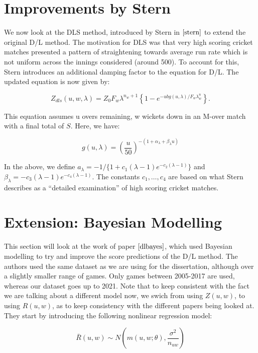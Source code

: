 \section{Improvements by Stern}
We now look at the DLS method, introduced by Stern in $\cite{stern}$ to extend the original D/L method. The motivation for DLS was that very high scoring
cricket matches presented a pattern of straightening towards average run rate which is not uniform across the innings considered (around 500). To account for 
this, Stern introduces an additional damping factor to the equation for D/L. The updated equation is now given by:

\begin{equation}
    \label{dls}
    Z_{dls}(u,w,\lambda) = Z_0F_w\lambda^{n_w+1} \left\{ 1-e^{-ubg(u,\lambda)/F_w\lambda^n_w} \right\}.
\end{equation}

This equation assumes u overs remaining, w wickets down in an M-over match with a final total of $S$. Here, we have:

\begin{equation}
    \label{gfunc}
    g(u,\lambda) = \left (\frac{u}{50} \right)^{-(1+\alpha_\lambda+\beta_\lambda u)}
\end{equation}

In the above, we define $a_\lambda = -1/\{1+c_1(\lambda-1)e^{-c_2(\lambda-1)}\}$ and $\beta_\lambda = -c_3(\lambda-1)e^{-c_4(\lambda-1)}$. The constants $c_1,\ldots,c_4$ are based on
what Stern describes as a ``detailed examination'' of high scoring cricket matches.

\section{Extension: Bayesian Modelling}
This section will look at the work of paper $\cite{dlbayes}$, which used Bayesian modelling to try and improve the score predictions
of the D/L method. The authors used the same dataset as we are using for the dissertation, although over a slightly smaller range of games.
Only games between 2005-2017 are used, whereas our dataset goes up to 2021. Note that to keep consistent with the fact we are talking about a different
model now, we swich from using $Z(u,w)$, to using $R(u,w)$, as to keep consistency with the different papers being looked at.
They start by introducing the following nonlinear regression model:

\begin{equation}
    \label{dlRegress}
    \bar{R}(u,w) \sim N(m(u,w;\theta),\frac{\sigma^2}{n_{uw}})
\end{equation}

